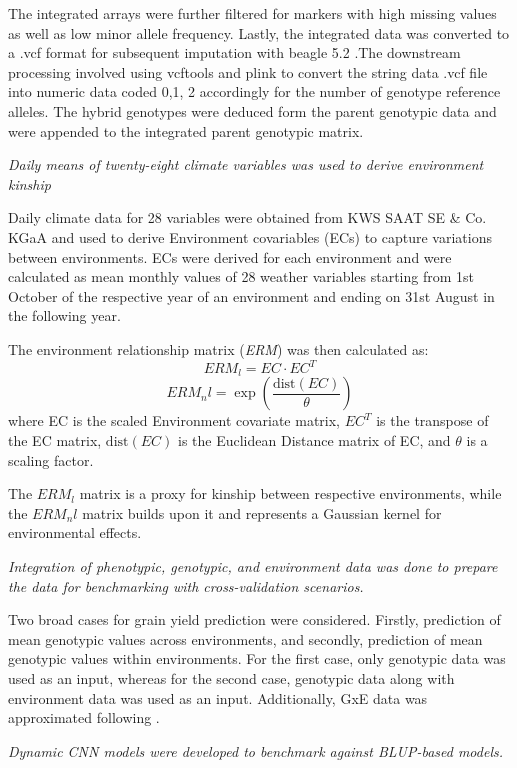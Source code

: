 \documentclass[english, biblatex]{lni}
\begin{document}
The integrated arrays were further filtered for markers with high missing values as well as low minor allele frequency. Lastly, the integrated data was converted to a .vcf format \cite{danecek2011variant} for subsequent imputation with beagle 5.2 \cite{browning2018one}.The downstream processing involved using vcftools \cite{danecek2011variant} and plink \cite{purcell2007plink} to convert the string data .vcf file into numeric data coded 0,1, 2 accordingly for the number of genotype reference alleles. The hybrid genotypes were deduced form the parent genotypic data and were appended to the integrated parent genotypic matrix.

\textit{Daily means of twenty-eight climate variables was used to derive environment kinship}

Daily climate data for 28 variables were obtained from KWS SAAT SE \& Co. KGaA and used to derive Environment covariables (ECs) to capture variations between environments. ECs were derived for each environment and were calculated as mean monthly values of 28 weather variables starting from 1st October of the respective year of an environment and ending on 31st August in the following year.

The environment relationship matrix (\textit{ERM}) was then calculated as:
\[
\textit{ERM}_l = EC \cdot EC^T
\]
\[
\textit{ERM}_nl = \exp\left(\frac{{\text{dist}(EC)}}{\theta}\right)
\]
where EC is the scaled Environment covariate matrix, $EC^T$ is the transpose of the EC matrix, $\text{dist}(EC)$ is the Euclidean Distance matrix of EC, and $\theta$ is a scaling factor.

The $\textit{ERM}_l$ matrix is a proxy for kinship between respective environments, while the $\textit{ERM}_nl$ matrix builds upon it and represents a Gaussian kernel for environmental effects.

\textit{Integration of phenotypic, genotypic, and environment data was done to prepare the data for benchmarking with cross-validation scenarios.}

Two broad cases for grain yield prediction were considered. Firstly, prediction of mean genotypic values across environments, and secondly, prediction of mean genotypic values within environments. For the first case, only genotypic data was used as an input, whereas for the second case, genotypic data along with environment data was used as an input. Additionally, GxE data was approximated following \cite{de2020data}.

\textit{Dynamic CNN models were developed to benchmark against BLUP-based models.}
\end{document}
